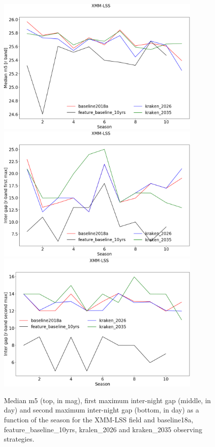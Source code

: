 \begin{figure}[htbp]
\begin{center}
  
  \includegraphics[width=10cm]{Figures/XMM-LSS_med_m5.png}
  \includegraphics[width=10cm]{Figures/XMM-LSS_intergap_max1.png}
    \includegraphics[width=10cm]{Figures/XMM-LSS_intergap_max2.png}
 \caption{Median m5 (top, in mag), first maximum inter-night gap (middle, in day) and second maximum inter-night gap (bottom, in day)  as a function of the season for the XMM-LSS field and baseline18a, feature\_baseline\_10yrs, kralen\_2026 and kraken\_2035 observing strategies.}\label{fig:xmm-lss_m5}
\end{center}
\end{figure}


